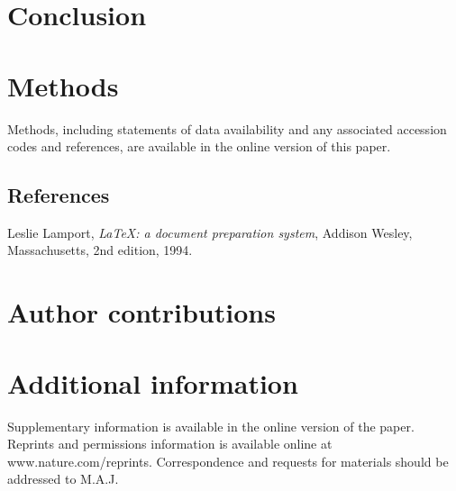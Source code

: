\documentclass[twocolumn, linenumbers, superscriptaddress]{revtex4-1}
\begin{document}
	\section*{Conclusion}

	\section*{Methods}
		Methods, including statements of data availability and any associated accession codes and references, are available in the online version of this paper.
	
	\begin{thebibliography}{50}
		\section*{References}	
			Leslie Lamport,
			\textit{\LaTeX: a document preparation system},
			Addison Wesley, Massachusetts,
			2nd edition,
			1994.

	\end{thebibliography}

	\begin{acknowledgements}

	\end{acknowledgements}

	\section*{Author contributions}
	
	\section*{Additional information}
		Supplementary information is available in the online version of the paper.
		Reprints and permissions information is available online at www.nature.com/reprints.
		Correspondence and requests for materials should be addressed to M.A.J.
	
\end{document}
